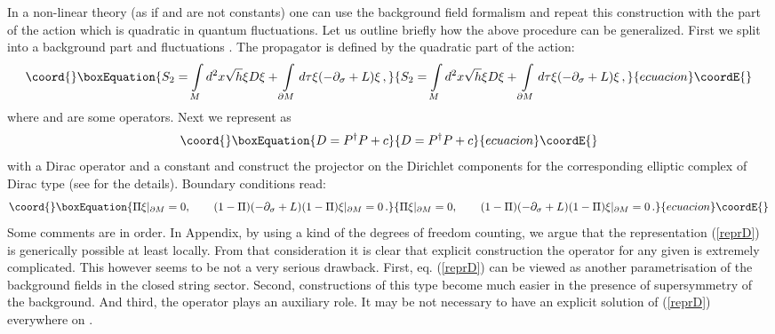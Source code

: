 \documentclass[a4paper,12pt,twoside]{article}
\begin{document}
In a non-linear theory (as if \coordHE{} and \coordHE{} are not constants)
one can use the background field formalism and repeat this
construction with the part of the action which is quadratic in
quantum fluctuations. Let us outline briefly how the above procedure
can be generalized. 
First we split \coordHE{} into a background
part \coordHE{} and fluctuations \myHighlight{$\xi$}\coordHE{}. The propagator is defined by
the quadratic part of the action:
\begin{equation}\coord{}\boxEquation{
S_2=\int\limits_M d^2x\sqrt{h} \xi D \xi +\int\limits_{\partial M}
d\tau\xi(-\partial_\sigma +L)\xi \,,\label{backact}
}{
S_2=\int\limits_M d^2x\sqrt{h} \xi D \xi +\int\limits_{\partial M}
d\tau\xi(-\partial_\sigma +L)\xi \,,}{ecuacion}\coordE{}\end{equation}
where \coordHE{} and \coordHE{} are some operators. Next we represent \coordHE{} as
\begin{equation}\coord{}\boxEquation{
D=P^\dag P +c \label{reprD}
}{
D=P^\dag P +c }{ecuacion}\coordE{}\end{equation}
with a Dirac operator \coordHE{} and a constant \coordHE{} and construct the
projector \myHighlight{$\Pi$}\coordHE{} on the Dirichlet components for the corresponding
elliptic complex of Dirac type (see \cite{Atiyah:1980jh,Grubb95,Dowker:2000sy}
for the details). Boundary conditions read:
\begin{equation}\coord{}\boxEquation{
\Pi \xi\vert_{\partial M}=0,\qquad 
(1-\Pi)(-\partial_\sigma +L)(1-\Pi)\xi\vert_{\partial M}=0\,.
\label{bcb}
}{
\Pi \xi\vert_{\partial M}=0,\qquad 
(1-\Pi)(-\partial_\sigma +L)(1-\Pi)\xi\vert_{\partial M}=0\,.
}{ecuacion}\coordE{}\end{equation}
Some comments are in order. In Appendix, by using a kind of the degrees
of freedom counting, we argue
that the representation (\ref{reprD}) is generically
possible at least locally. From that consideration
it is clear that explicit construction the operator \coordHE{} for any given \coordHE{}
is extremely complicated. This however seems to be not a very serious
drawback. First, eq. (\ref{reprD}) can be viewed as another parametrisation
of the background fields in the closed string sector. Second, constructions
of this type become much easier in the presence of supersymmetry of
the background. And third, the operator \coordHE{} plays an auxiliary role.
It may be not necessary to have an explicit solution of (\ref{reprD})
everywhere on \coordHE{}.
\end{document}
